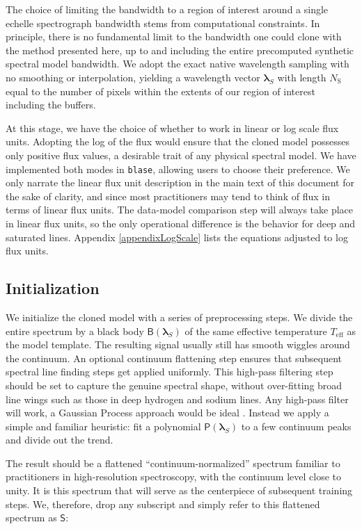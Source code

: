 \documentclass[trackchanges]{aastex631}
\begin{document}
The choice of limiting the bandwidth to a region of interest around a single echelle spectrograph bandwidth stems from computational constraints. In principle, there is no fundamental limit to the bandwidth one could clone with the method presented here, up to and including the entire precomputed synthetic spectral model bandwidth. We adopt the exact native wavelength sampling with no smoothing or interpolation, yielding a wavelength vector $\bm{\lambda}_S$ with length $N_\mathrm{S}$ equal to the number of pixels within the extents of our region of interest including the buffers.

At this stage, we have the choice of whether to work in linear or log scale flux units. Adopting the log of the flux would ensure that the cloned model possesses only positive flux values, a desirable trait of any physical spectral model. We have implemented both modes in \texttt{blase}, allowing users to choose their preference.  We only narrate the linear flux unit description in the main text of this document for the sake of clarity, and since most practitioners may tend to think of flux in terms of linear flux units.  The data-model comparison step will always take place in linear flux units, so the only operational difference is the behavior for deep and saturated lines.  Appendix \ref{appendixLogScale} lists the equations adjusted to log flux units.

\subsection{Initialization}\label{subsecInit}

We initialize the cloned model with a series of preprocessing steps. We divide the entire spectrum by a black body $\mathsf{B}(\bm{\lambda}_S)$ of the same effective temperature $T_{\mathrm{eff}}$ as the model template. The resulting signal usually still has smooth wiggles around the continuum. An optional continuum flattening step ensures that subsequent spectral line finding steps get applied uniformly. This high-pass filtering step should be set to capture the genuine spectral shape, without over-fitting broad line wings such as those in deep hydrogen and sodium lines. Any high-pass filter will work, a Gaussian Process approach would be ideal \citep{czekala15}.  Instead we apply a simple and familiar heuristic: fit a polynomial $\mathsf{P}(\bm{\lambda}_S)$ to a few continuum peaks and divide out the trend.

The result should be a flattened ``continuum-normalized'' spectrum familiar to practitioners in high-resolution spectroscopy, with the continuum level close to unity.  It is this spectrum that will serve as the centerpiece of subsequent training steps.  We, therefore, drop any subscript and simply refer to this flattened spectrum as $\mathsf{S}$:
\end{document}
